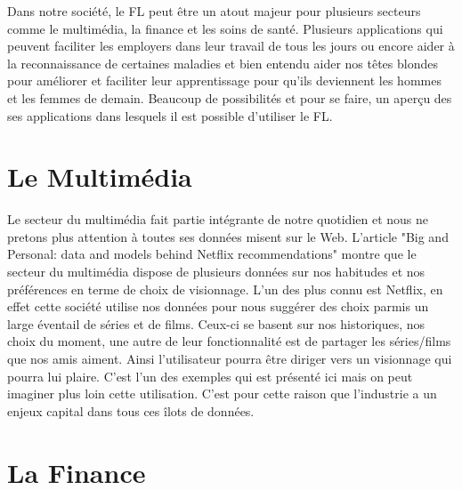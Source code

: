 \documentclass[12pt,a4paper]{report}
\begin{document}
Dans notre société, le FL peut être un atout majeur pour plusieurs secteurs comme le multimédia, la finance et les soins de santé. Plusieurs applications qui peuvent faciliter les employers dans leur travail de tous les jours ou encore aider à la reconnaissance de certaines maladies et bien entendu aider nos têtes blondes pour améliorer et faciliter leur apprentissage pour qu'ils deviennent les hommes et les femmes de demain. Beaucoup de possibilités et pour se faire, un aperçu des ses applications dans lesquels il est possible d'utiliser le FL. 


\section{Le Multimédia}

Le secteur du multimédia fait partie intégrante de notre quotidien et nous ne pretons plus attention à toutes ses données misent sur le Web. L'article "Big and Personal: data and models behind Netflix recommendations" montre que le secteur du multimédia dispose de plusieurs données sur nos habitudes et nos préférences en terme de choix de visionnage. L'un des plus connu est Netflix, en effet cette société utilise nos données pour nous suggérer des choix parmis un large éventail de séries et de films. Ceux-ci se basent sur nos historiques, nos choix du moment, une autre de leur fonctionnalité est de partager les séries/films que nos amis aiment. Ainsi l'utilisateur pourra être diriger vers un visionnage qui pourra lui plaire. C'est l'un des exemples qui est présenté ici mais on peut imaginer plus loin cette utilisation. C'est pour cette raison que l'industrie a un enjeux capital dans tous ces îlots de données.\\

\section{La Finance}
\end{document}
